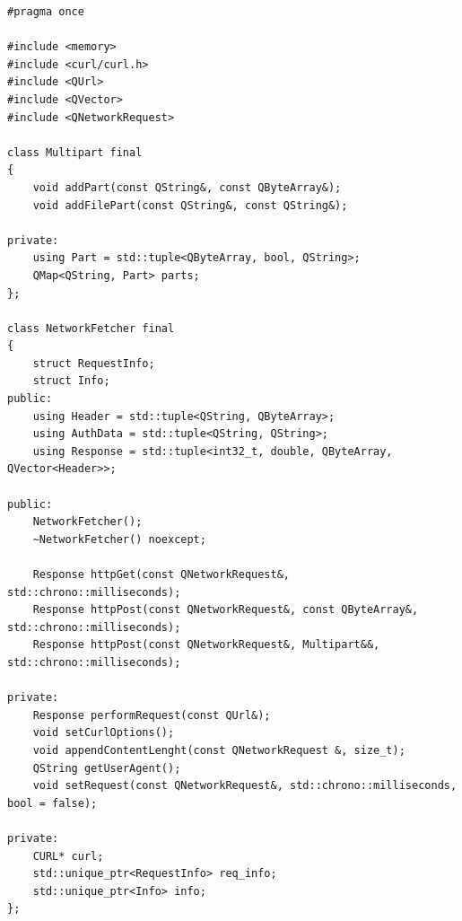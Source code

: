 \documentclass[a4paper,14pt]{article}
\begin{document}
\begin{lstlisting}[label=net_h,caption=\text{network\_fetcher.h.}]
#pragma once

#include <memory>
#include <curl/curl.h>
#include <QUrl>
#include <QVector>
#include <QNetworkRequest>
	
class Multipart final
{
	void addPart(const QString&, const QByteArray&);
	void addFilePart(const QString&, const QString&);

private:
	using Part = std::tuple<QByteArray, bool, QString>;
	QMap<QString, Part> parts;
};

class NetworkFetcher final
{
	struct RequestInfo;
	struct Info;
public:
	using Header = std::tuple<QString, QByteArray>;
	using AuthData = std::tuple<QString, QString>;
	using Response = std::tuple<int32_t, double, QByteArray, QVector<Header>>;
	
public:
	NetworkFetcher();
	~NetworkFetcher() noexcept;

	Response httpGet(const QNetworkRequest&, std::chrono::milliseconds);
	Response httpPost(const QNetworkRequest&, const QByteArray&, std::chrono::milliseconds);
	Response httpPost(const QNetworkRequest&, Multipart&&, std::chrono::milliseconds);
	
private:
	Response performRequest(const QUrl&);
	void setCurlOptions();
	void appendContentLenght(const QNetworkRequest &, size_t);
	QString getUserAgent();
	void setRequest(const QNetworkRequest&, std::chrono::milliseconds, bool = false);
	
private:
	CURL* curl;
	std::unique_ptr<RequestInfo> req_info;
	std::unique_ptr<Info> info;
};	
\end{lstlisting}
\end{document}
